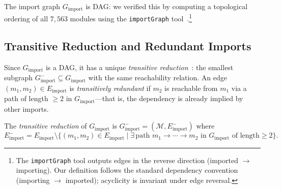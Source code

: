 The import graph $G_{\mathrm{import}}$ is DAG: we verified this by computing a topological ordering of all $7{,}563$ modules using the \texttt{importGraph} tool~\cite{importgraph}.\footnote{The \texttt{importGraph} tool outputs edges in the reverse direction (imported $\to$ importing). Our definition follows the standard dependency convention (importing $\to$ imported); acyclicity is invariant under edge reversal.} 

\subsection{Transitive Reduction and Redundant Imports}
\label{sec:transitive-reduction}

Since $G_{\mathrm{import}}$ is a DAG, it has a unique \emph{transitive reduction}~\cite{ahu1972}: the smallest subgraph $G_{\mathrm{import}}^{-} \subseteq G_{\mathrm{import}}$ with the same reachability relation. An edge $(m_1, m_2) \in E_{\mathrm{import}}$ is \emph{transitively redundant} if $m_2$ is reachable from $m_1$ via a path of length $\ge 2$ in $G_{\mathrm{import}}$---that is, the dependency is already implied by other imports.

\begin{definition}
The \emph{transitive reduction} of $G_{\mathrm{import}}$ is $G_{\mathrm{import}}^{-} = (\mathcal{M}, E_{\mathrm{import}}^{-})$ where
\[
  E_{\mathrm{import}}^{-} = E_{\mathrm{import}} \setminus \{(m_1, m_2)\in E_{\mathrm{import}} \mid \exists\, \text{path } m_1 \to \cdots \to m_2 \text{ in } G_{\mathrm{import}} \text{ of length} \ge 2\}.
\]
\end{definition}

